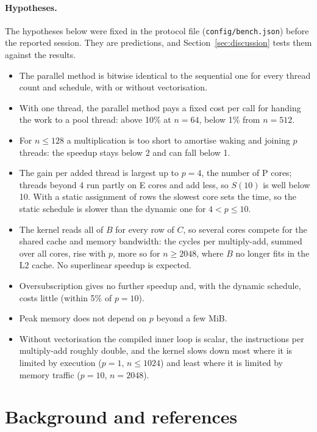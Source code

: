 \documentclass[11pt,a4paper]{article}
\begin{document}
\paragraph{Hypotheses.} The hypotheses below were fixed in the protocol file
(\texttt{config/bench.json}) before the reported session. They are predictions,
and Section~\ref{sec:discussion} tests them against the results.
\begin{itemize}
  \item[H1] The parallel method is bitwise identical to the sequential one for
  every thread count and schedule, with or without vectorisation.
  \item[H2] With one thread, the parallel method pays a fixed cost per call for
  handing the work to a pool thread: above 10\% at $n=64$, below 1\% from
  $n=512$.
  \item[H3] For $n\le128$ a multiplication is too short to amortise waking and
  joining $p$ threads: the speedup stays below 2 and can fall below 1.
  \item[H4] The gain per added thread is largest up to $p=4$, the number of P
  cores; threads beyond 4 run partly on E cores and add less, so $S(10)$ is well
  below 10. With a static assignment of rows the slowest core sets the time, so
  the static schedule is slower than the dynamic one for $4<p\le10$.
  \item[H5] The kernel reads all of $B$ for every row of $C$, so several cores
  compete for the shared cache and memory bandwidth: the cycles per
  multiply-add, summed over all cores, rise with $p$, more so for $n\ge2048$,
  where $B$ no longer fits in the L2 cache. No superlinear speedup is expected.
  \item[H6] Oversubscription gives no further speedup and, with the dynamic
  schedule, costs little (within 5\% of $p=10$).
  \item[H7] Peak memory does not depend on $p$ beyond a few MiB.
  \item[H8] Without vectorisation the compiled inner loop is scalar, the
  instructions per multiply-add roughly double, and the kernel slows down most
  where it is limited by execution ($p=1$, $n\le1024$) and least where it is
  limited by memory traffic ($p=10$, $n=2048$).
\end{itemize}

\section{Background and references}
\end{document}
